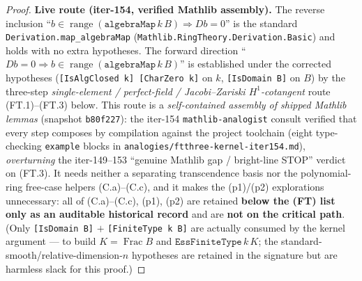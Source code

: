 \begin{proof}

\leanok
  \textbf{Live route (iter-154, verified Mathlib assembly).} The reverse inclusion ``\(b \in \operatorname{range}(\mathtt{algebraMap}\,k\,B) \Rightarrow D b = 0\)'' is the standard \texttt{Derivation.map\_algebraMap} (\texttt{Mathlib.RingTheory.Derivation.Basic}) and holds with no extra hypotheses. The forward direction ``\(D b = 0 \Rightarrow b \in \operatorname{range}(\mathtt{algebraMap}\,k\,B)\)'' is established under the corrected hypotheses (\texttt{[IsAlgClosed k] [CharZero k]} on \(k\), \texttt{[IsDomain B]} on \(B\)) by the three-step \emph{single-element / perfect-field / Jacobi--Zariski \(H^1\)-cotangent} route (FT.1)--(FT.3) below. This route is a \emph{self-contained assembly of shipped Mathlib lemmas} (snapshot \texttt{b80f227}): the iter-154 \texttt{mathlib-analogist} consult verified that every step composes by compilation against the project toolchain (eight type-checking \texttt{example} blocks in \texttt{analogies/ftthree-kernel-iter154.md}), \emph{overturning} the iter-149--153 ``genuine Mathlib gap / bright-line STOP'' verdict on (FT.3). It needs neither a separating transcendence basis nor the polynomial-ring free-case helpers (C.a)--(C.c), and it makes the (p1)/(p2) explorations unnecessary: all of (C.a)--(C.c), (p1), (p2) are retained \textbf{below the (FT) list only as an auditable historical record} and are \textbf{not on the critical path}. (Only \texttt{[IsDomain B]} \(+\) \texttt{[FiniteType k B]} are actually consumed by the kernel argument --- to build \(K = \operatorname{Frac} B\) and \(\mathtt{EssFiniteType}\,k\,K\); the standard-smooth/relative-dimension-\(n\) hypotheses are retained in the signature but are harmless slack for this proof.)


\end{proof}
